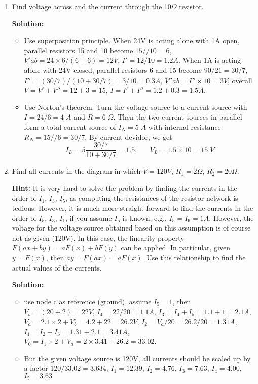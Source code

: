 \begin{enumerate}
\begin{enumerate}
\begin{itemize}
\end{itemize}


\item Find voltage across and the current through the 10$\Omega$ resistor.


{\bf Solution:}

\begin{itemize}
\item Use superposition principle. When 24V is acting alone with 1A open, 
  parallel resistors 15 and 10 become $15//10=6$, $V'ab=24 \times 6/(6+6)=12V$,
  $I'=12/10=1.2A$. When 1A is acting alone with 24V closed, parallel resistors
  6 and 15 become $90/21=30/7$, $I''=(30/7)/(10+30/7)=3/10=0.3 A$, $V''ab=I''
  \times 10=3V$, overall $V=V'+V''=12+3=15$, $I=I'+I''=1.2+0.3=1.5A$.

\item Use Norton's theorem. Turn the voltage source to a current source with
  $I=24/6=4\;A$ and $R=6\;\Omega$. Then the two current sources in parallel
  form a total current source of $I_N=5\;A$ with internal resistance 
  $R_N=15//6=30/7$. By current devidor, we get 
  \[ I_L=5\frac{30/7}{10+30/7}=1.5, \;\;\;\;\;\;V_L=1.5\times 10=15 \;V \]
\end{itemize}

\item Find all currents in the diagram in which $V=120V$, $R_1=2\Omega$, 
  $R_2=20\Omega$. 

  {\bf Hint:} It is very hard to solve the problem by finding the currents in 
  the order of $I_1$, $I_3$, $I_5$, as computing the resistances of the resistor 
  network is tedious. However, it is much more straight forward to find the 
  currents in the order of $I_5$, $I_3$, $I_1$, if you assume $I_5$ is known, 
  e.g., $I_5=I_6=1A$. However, the voltage for the voltage source obtained 
  based on this assumption is of course not as given (120V). In this case, the 
  linearity property $F(ax+by)=aF(x)+bF(y)$ can be applied. In particular, 
  given $y=F(x)$, then $ay=F(ax)=aF(x)$. Use this relationship to find the
  actual values of the currents.


{\bf Solution:}
\begin{itemize}
\item use node c as reference (ground), assume $I_5=1$, then $V_b=(20+2)=22V$,
  $I_4=22/20=1.1A$, $I_3=I_4+I_5=1.1+1=2.1A$, $V_a=2.1\times 2+V_b=4.2+22=26.2V$,
  $I_2=V_a/20=26.2/20=1.31A$, $I_1=I_2+I_3=1.31+2.1=3.41A$, 
  $V_0=I_1\times 2+V_a=2\times 3.41+26.2=33.02$.
\item But the given voltage source is 120V, all currents should be scaled 
  up by a factor $120/33.02=3.634$, $I_1=12.39$, $I_2=4.76$, $I_3=7.63$,
  $I_4=4.00$, $I_5=3.63$
\end{itemize}


\end{enumerate}
\end{enumerate}
